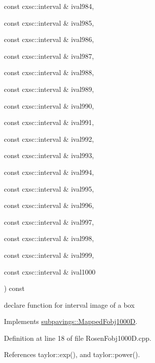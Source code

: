{{\begin{DoxyParamCaption}
\item[{const cxsc\-::interval \&}]{ival984, }
\item[{const cxsc\-::interval \&}]{ival985, }
\item[{const cxsc\-::interval \&}]{ival986, }
\item[{const cxsc\-::interval \&}]{ival987, }
\item[{const cxsc\-::interval \&}]{ival988, }
\item[{const cxsc\-::interval \&}]{ival989, }
\item[{const cxsc\-::interval \&}]{ival990, }
\item[{const cxsc\-::interval \&}]{ival991, }
\item[{const cxsc\-::interval \&}]{ival992, }
\item[{const cxsc\-::interval \&}]{ival993, }
\item[{const cxsc\-::interval \&}]{ival994, }
\item[{const cxsc\-::interval \&}]{ival995, }
\item[{const cxsc\-::interval \&}]{ival996, }
\item[{const cxsc\-::interval \&}]{ival997, }
\item[{const cxsc\-::interval \&}]{ival998, }
\item[{const cxsc\-::interval \&}]{ival999, }
\item[{const cxsc\-::interval \&}]{ival1000}
\end{DoxyParamCaption}
) const}}\label{classRosenFobj1000D_a86034752b1c81741fd81edb9a7df3059}


declare function for interval image of a box 



\-Implements \hyperlink{classsubpavings_1_1MappedFobj1000D_a670902de15082329951f7992f5017205}{subpavings\-::\-Mapped\-Fobj1000\-D}.



\-Definition at line 18 of file \-Rosen\-Fobj1000\-D.\-cpp.



\-References taylor\-::exp(), and taylor\-::power().



